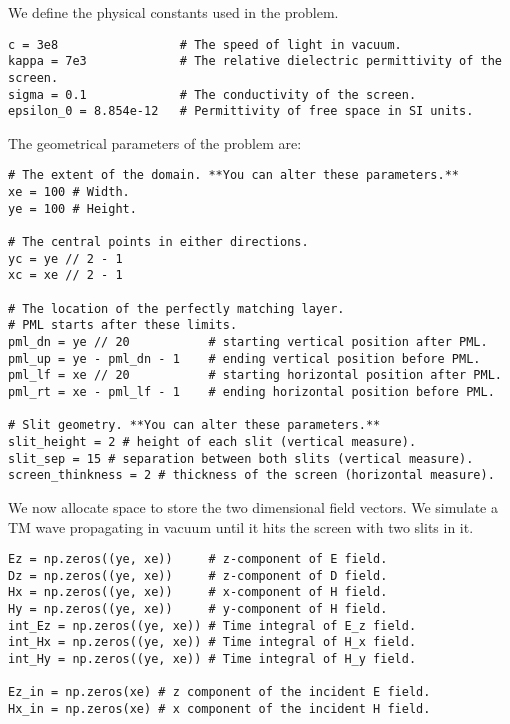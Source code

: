 \documentclass[11pt]{article}
\numberwithin{equation}{section}
\begin{document}
We define the physical constants used in the problem.
\begin{verbatim}
c = 3e8                 # The speed of light in vacuum.
kappa = 7e3             # The relative dielectric permittivity of the screen.
sigma = 0.1             # The conductivity of the screen.
epsilon_0 = 8.854e-12   # Permittivity of free space in SI units.
\end{verbatim}

The geometrical parameters of the problem are:
\begin{verbatim}
# The extent of the domain. **You can alter these parameters.**
xe = 100 # Width.
ye = 100 # Height.

# The central points in either directions.
yc = ye // 2 - 1
xc = xe // 2 - 1

# The location of the perfectly matching layer. 
# PML starts after these limits.
pml_dn = ye // 20           # starting vertical position after PML.
pml_up = ye - pml_dn - 1    # ending vertical position before PML.
pml_lf = xe // 20           # starting horizontal position after PML.
pml_rt = xe - pml_lf - 1    # ending horizontal position before PML.

# Slit geometry. **You can alter these parameters.**
slit_height = 2 # height of each slit (vertical measure).
slit_sep = 15 # separation between both slits (vertical measure).
screen_thinkness = 2 # thickness of the screen (horizontal measure).
\end{verbatim}

We now allocate space to store the two dimensional field vectors. We simulate
a TM wave propagating in vacuum until it hits the screen with two slits in 
it.
\begin{verbatim}
Ez = np.zeros((ye, xe))     # z-component of E field.
Dz = np.zeros((ye, xe))     # z-component of D field.
Hx = np.zeros((ye, xe))     # x-component of H field.
Hy = np.zeros((ye, xe))     # y-component of H field.
int_Ez = np.zeros((ye, xe)) # Time integral of E_z field.
int_Hx = np.zeros((ye, xe)) # Time integral of H_x field.
int_Hy = np.zeros((ye, xe)) # Time integral of H_y field.

Ez_in = np.zeros(xe) # z component of the incident E field.
Hx_in = np.zeros(xe) # x component of the incident H field.
\end{verbatim}
\end{document}
